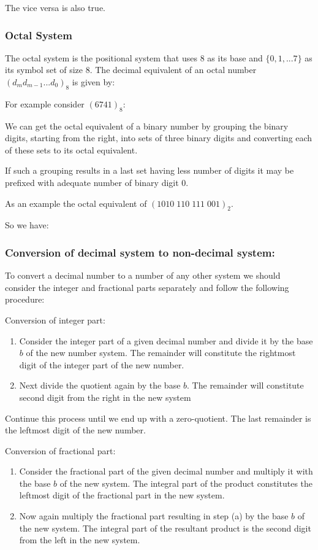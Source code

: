 	The vice versa is also true.
	
	\subsubsection{Octal System}  
	The octal system is the positional
	system that uses 8 as its base and $\{0,1,...7\}$ as its symbol set of size 8. The decimal equivalent of an octal number $(d_{m}d_{m-1}...d_{0})_{8}$ is given by:
	
	 For example consider $(6741)_{8}$:
	 
	
	We can get the octal equivalent of a binary number by grouping the binary digits, starting from the right, into sets of three binary digits and converting each of these sets to its octal equivalent.
	
	If such a grouping results in a last set having less number of digits it may be prefixed with adequate number of binary digit 0.
	
	As an example the octal equivalent of $(1010\;110\;111\;001)_{2}$.
	
	So we have:
	
	
	\pagebreak
	\subsubsection{Conversion of decimal system to non-decimal system:}
	To convert a decimal number to a number of any other system we should consider the integer and fractional parts separately and follow the following procedure:
	
	Conversion of integer part:
	\begin{enumerate}
		\item Consider the integer part of a given decimal number and divide it by the base $b$ of the new number system. The remainder will constitute the rightmost digit of the integer part of the new number.

		\item Next divide the quotient again by the base $b$. The remainder will constitute second digit from the right in the new system
	\end{enumerate}
	
	Continue this process until we end up with a zero-quotient. The last remainder is the leftmost digit of the new number.
	
	Conversion of fractional part:
	\begin{enumerate}
		\item Consider the fractional part of the given decimal number and multiply it with the base $b$ of the new system. The integral part of the product constitutes the leftmost digit of the fractional part in the new system.

		\item Now again multiply the fractional part resulting in step (a) by the base $b$ of the new system. The integral part of the resultant product is the second digit from the left in the new system.
	\end{enumerate} 
	

